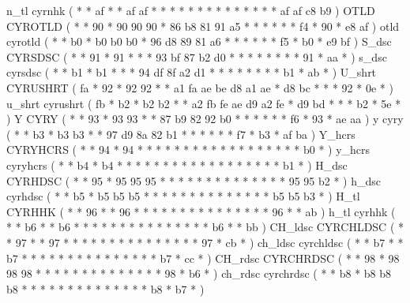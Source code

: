 \makecod n_tl         cyrnhk            ( *  *       af *   *  af af *     *  *  *  *  *     *  *  *  *     *  *  *     *   af af   c8 b9  )
%
\makeCOD OTLD         CYROTLD           ( *  *       90 *   90 90 90 *     86 b8 81 91 a5    *  *  *  *     *  *  f4    *   90 *    e8 af  )
\makecod otld         cyrotld           ( *  *       b0 *   b0 b0 b0 *     96 d8 89 81 a6    *  *  *  *     *  *  f5    *   b0 *    e9 bf  )
\makeCOD S_dsc        CYRSDSC           ( *  *       91 *   91 *  *  *     93 bf 87 b2 d0    *  *  *  *     *  *  *     *   91 *    aa *   )
\makecod s_dsc        cyrsdsc           ( *  *       b1 *   b1 *  *  *     94 df 8f a2 d1    *  *  *  *     *  *  *     *   b1 *    ab *   )
\makeCOD U_shrt       CYRUSHRT          ( fa *       92 *   92 92 *  *     a1 fa ae be d8    a1 ae *  d8    bc *  *     *   92 *    0e *   )
\makecod u_shrt       cyrushrt          ( fb *       b2 *   b2 b2 *  *     a2 fb fe ae d9    a2 fe *  d9    bd *  *     *   b2 *    5e *   )
\makeCOD Y            CYRY              ( *  *       93 *   93 93 *  *     87 b9 82 92 b0    *  *  *  *     *  *  f6    *   93 *    ae aa  )
\makecod y            cyry              ( *  *       b3 *   b3 b3 *  *     97 d9 8a 82 b1    *  *  *  *     *  *  f7    *   b3 *    af ba  )
\makeCOD Y_hcrs       CYRYHCRS          ( *  *       94 *   94 *  *  *     *  *  *  *  *     *  *  *  *     *  *  *     *   *  *    b0 *   )
\makecod y_hcrs       cyryhcrs          ( *  *       b4 *   b4 *  *  *     *  *  *  *  *     *  *  *  *     *  *  *     *   *  *    b1 *   )
\makeCOD H_dsc        CYRHDSC           ( *  *       95 *   95 95 95 *     *  *  *  *  *     *  *  *  *     *  *  *     *   95 95   b2 *   )
\makecod h_dsc        cyrhdsc           ( *  *       b5 *   b5 b5 b5 *     *  *  *  *  *     *  *  *  *     *  *  *     *   b5 b5   b3 *   )
\makeCOD H_tl         CYRHHK            ( *  *       96 *   *  96 *  *     *  *  *  *  *     *  *  *  *     *  *  *     *   96 *    *  ab  )
\makecod h_tl         cyrhhk            ( *  *       b6 *   *  b6 *  *     *  *  *  *  *     *  *  *  *     *  *  *     *   b6 *    *  bb  )
\makeCOD CH_ldsc      CYRCHLDSC         ( *  *       97 *   *  97 *  *     *  *  *  *  *     *  *  *  *     *  *  *     *   97 *    cb *   )
\makecod ch_ldsc      cyrchldsc         ( *  *       b7 *   *  b7 *  *     *  *  *  *  *     *  *  *  *     *  *  *     *   b7 *    cc *   )
\makeCOD CH_rdsc      CYRCHRDSC         ( *  *       98 *   98 98 98 *     *  *  *  *  *     *  *  *  *     *  *  *     *   98 *    b6 *   )
\makecod ch_rdsc      cyrchrdsc         ( *  *       b8 *   b8 b8 b8 *     *  *  *  *  *     *  *  *  *     *  *  *     *   b8 *    b7 *   )
